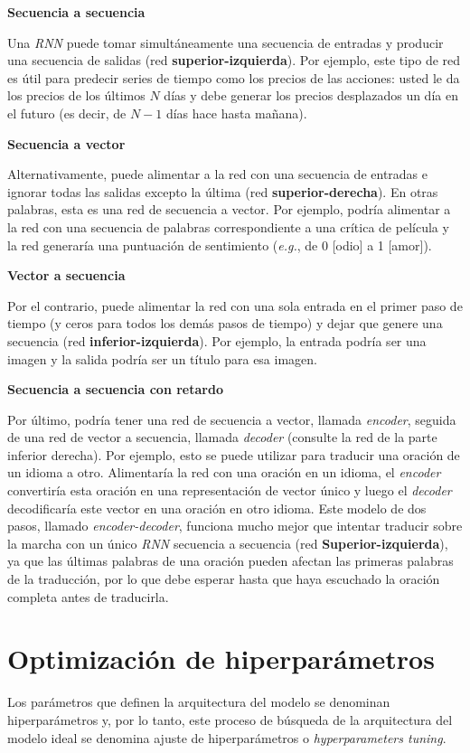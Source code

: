\documentclass[a4paper,12pt]{article}
\begin{document}
\textbf{Secuencia a secuencia}

Una \textit{RNN} puede tomar simultáneamente una secuencia de entradas y producir una secuencia de salidas (red \textbf{superior-izquierda}). Por ejemplo, este tipo de red es útil para predecir series de tiempo como los precios de las acciones: usted le da los precios de los últimos $N$ días y debe generar los precios desplazados un día en el futuro (es decir, de $N - 1$ días hace hasta mañana).

\textbf{Secuencia a vector}

Alternativamente, puede alimentar a la red con una secuencia de entradas e ignorar todas las salidas excepto la última (red \textbf{superior-derecha}). En otras palabras, esta es una red de secuencia a vector. Por ejemplo, podría alimentar a la red con una secuencia de palabras correspondiente a una crítica de película y la red generaría una puntuación de sentimiento (\textit{e.g.}, de 0 [odio] a 1 [amor]).

\textbf{Vector a secuencia}

Por el contrario, puede alimentar la red con una sola entrada en el primer paso de tiempo (y ceros para todos los demás pasos de tiempo) y dejar que genere una secuencia (red \textbf{inferior-izquierda}). Por ejemplo, la entrada podría ser una imagen y la salida podría ser un título para esa imagen.

\textbf{Secuencia a secuencia con retardo}

Por último, podría tener una red de secuencia a vector, llamada \textit{encoder}, seguida de una red de vector a secuencia, llamada \textit{decoder} (consulte la red de la parte inferior derecha). Por ejemplo, esto se puede utilizar para traducir una oración de un idioma a otro. Alimentaría la red con una oración en un idioma, el \textit{encoder} convertiría esta oración en una representación de vector único y luego el \textit{decoder} decodificaría este vector en una oración en otro idioma. Este modelo de dos pasos, llamado \textit{encoder-decoder}, funciona mucho mejor que intentar traducir sobre la marcha con un único \textit{RNN} secuencia a secuencia (red \textbf{Superior-izquierda}), ya que las últimas palabras de una oración pueden afectan las primeras palabras de la traducción, por lo que debe esperar hasta que haya escuchado la oración completa antes de traducirla.

\clearpage

\section{Optimización de hiperparámetros} \label{tuning-hp}
Los parámetros que definen la arquitectura del modelo se denominan hiperparámetros y, por lo tanto, este proceso de búsqueda de la arquitectura del modelo ideal se denomina ajuste de hiperparámetros o \textit{hyperparameters tuning}. \citep{Koehrsen2018Jul}
\end{document}
